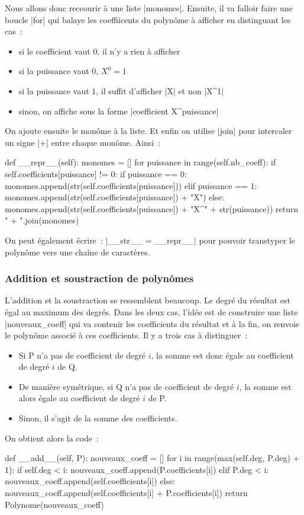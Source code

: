 		Nous allons donc reccourir à une liste \python|monomes|. Ensuite, il va falloir faire une boucle \python|for| qui balaye les coeffiicents du polynôme à afficher en distinguant les cas~:
		\begin{itemize}
			\item si le coefficient vaut $0$, il n'y a rien à afficher
			\item si la puissance vaut $0$, $X^0 = 1$
			\item si la puissance vaut $1$, il suffit d'afficher \python|X| et non \python|X^1|
			\item sinon, on affiche sous la forme \python|coefficient X^puissance|
		\end{itemize}
		On ajoute ensuite le monôme à la liste. Et enfin on utilise \python|join| pour intercaler un signe \python|+| entre chaque monôme. Ainsi~:
		\begin{pythoncode}
			def __repr__(self):
			    monomes = []
			    for puissance in range(self.nb_coeff):
				if self.coefficients[puissance] != 0:
				    if puissance == 0:
				        monomes.append(str(self.coefficients[puissance]))
				    elif puissance == 1:
				        monomes.append(str(self.coefficients[puissance]) + "X")
				    else:
				        monomes.append(str(self.coefficients[puissance]) + "X^" + str(puissance))
			    return " + ".join(monomes)
		\end{pythoncode}
		
		On peut également écrire~: \python|__str__ = __repr__| pour pouvoir transtyper le polynôme vers une chaîne de caractères.
		
		\subsubsection{Addition et soustraction de polynômes}
		L'addition et la soustraction se ressemblent beaucoup. Le degré du résultat est égal au maximum des degrés. Dans les deux cas, l'idée est de construire une liste \python|nouveaux_coeff| qui va contenir les coefficients du résultat et à la fin, on renvoie le polynôme associé à ces coefficients. Il y a trois cas à distinguer~:
		\begin{itemize}
			\item Si P n'a pas de coefficient de degré $i$, la somme est donc égale au coefficient de degré $i$ de Q.
			\item De manière symétrique, si Q n'a pas de coefficient de degré $i$, la somme est alors égale au coefficient de degré $i$ de P.
			\item Sinon, il s'agit de la somme des coefficients.
		\end{itemize}
		On obtient alors la code~:
		\begin{pythoncode}
			def __add__(self, P):
				nouveaux_coeff = []
				for i in range(max(self.deg, P.deg) + 1):
				    if self.deg < i:
				        nouveaux_coeff.append(P.coefficients[i])
				    elif P.deg < i:
				        nouveaux_coeff.append(self.coefficients[i])
				    else:
				        nouveaux_coeff.append(self.coefficients[i] + P.coefficients[i])
				return Polynome(nouveaux_coeff)
		\end{pythoncode}
		
